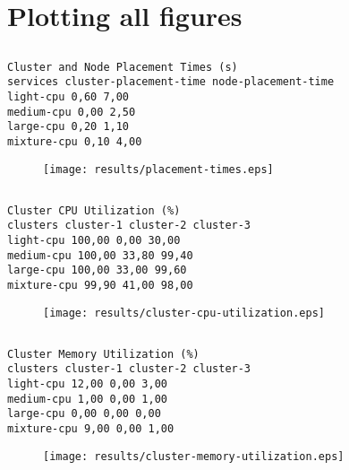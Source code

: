 \documentclass{elsart}
\begin{document}
\section{Plotting all figures}
\subsection{}

\begin{lstlisting}[caption={}]
Cluster and Node Placement Times (s)
services cluster-placement-time node-placement-time
light-cpu 0,60 7,00
medium-cpu 0,00 2,50
large-cpu 0,20 1,10
mixture-cpu 0,10 4,00
\end{lstlisting}

\begin{figure}[ht]
\centering
\texttt{[image: results/placement-times.eps]}
\caption{}\label{fig:placement-times.eps}
\end{figure}

\subsection{}

\begin{lstlisting}[caption={}]
Cluster CPU Utilization (%)
clusters cluster-1 cluster-2 cluster-3
light-cpu 100,00 0,00 30,00
medium-cpu 100,00 33,80 99,40
large-cpu 100,00 33,00 99,60
mixture-cpu 99,90 41,00 98,00
\end{lstlisting}

\begin{figure}[ht]
\centering
\texttt{[image: results/cluster-cpu-utilization.eps]}
\caption{}\label{fig:cluster-cpu-utilization.eps}
\end{figure}

\subsection{}

\begin{lstlisting}[caption={}]
Cluster Memory Utilization (%)
clusters cluster-1 cluster-2 cluster-3
light-cpu 12,00 0,00 3,00
medium-cpu 1,00 0,00 1,00
large-cpu 0,00 0,00 0,00
mixture-cpu 9,00 0,00 1,00
\end{lstlisting}

\begin{figure}[ht]
\centering
\texttt{[image: results/cluster-memory-utilization.eps]}
\caption{}\label{fig:cluster-memory-utilization.eps}
\end{figure}
\end{document}
